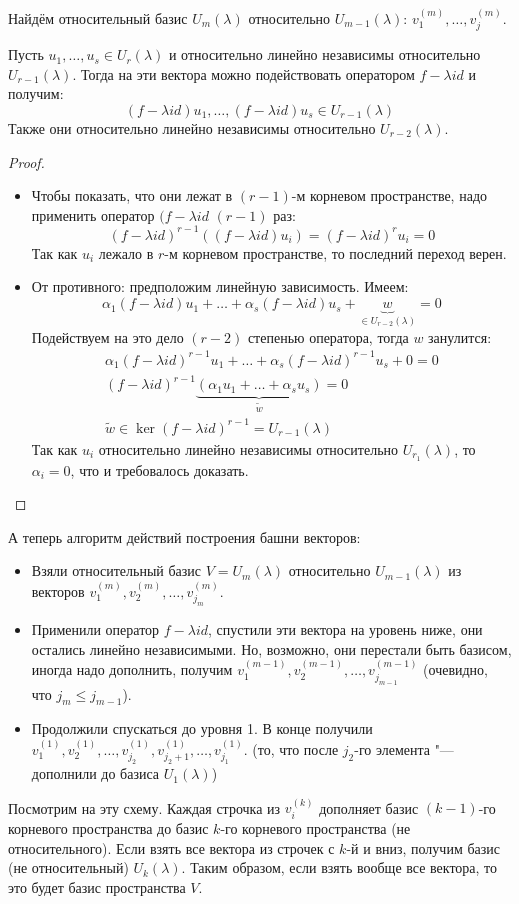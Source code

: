 Найдём относительный базис $U_m(\lambda)$ относительно $U_{m-1}(\lambda)$: $v_1^{(m)}, \dots, v_j^{(m)}$.
\begin{lemma}
	Пусть $u_1, \dots, u_s \in U_r(\lambda)$ и относительно линейно независимы относительно $U_{r-1}(\lambda)$.
	Тогда на эти вектора можно подействовать оператором $f-\lambda id$ и получим:
	\[ (f-\lambda id)u_1, \dots, (f-\lambda id)u_s \in U_{r-1}(\lambda)\]
	Также они относительно линейно независимы относительно $U_{r-2}(\lambda)$.
\end{lemma}
\begin{proof}
	\begin{itemize}
	\item
		Чтобы показать, что они лежат в $(r-1)$-м корневом пространстве, надо применить оператор $(f-\lambda id$ $(r-1)$ раз:
		\[ (f - \lambda id)^{r-1} ((f-\lambda id) u_i) = (f - \lambda id)^r u_i = 0 \]
		Так как $u_i$ лежало в $r$-м корневом пространстве, то последний переход верен.
	\item
		От противного: предположим линейную зависимость.
		Имеем:
		\[ \alpha_1(f-\lambda id) u_1 + \dots + \alpha_s (f-\lambda id) u_s + \underbrace{w}_{\in U_{r-2}(\lambda)} = 0\]
		Подействуем на это дело $(r-2)$ степенью оператора, тогда $w$ занулится:
		\begin{gather*}
			\alpha_1(f-\lambda id)^{r-1} u_1 + \dots + \alpha_s (f-\lambda id)^{r-1} u_s + 0 = 0 \\
			(f-\lambda id)^{r-1}\underbrace{(\alpha_1 u_1 + \dots + \alpha_s u_s )}_{\widetilde w} = 0 \\
			\widetilde w \in \ker (f - \lambda id)^{r-1} = U_{r-1}(\lambda)
		\end{gather*}
		Так как $u_i$ относительно линейно независимы относительно $U_{r_1}(\lambda)$, то $\alpha_i=0$,
		что и требовалось доказать.
	\end{itemize}
\end{proof}

А теперь алгоритм действий построения башни векторов:
\begin{itemize}
\item
	Взяли относительный базис $V=U_m(\lambda)$ относительно $U_{m-1}(\lambda)$ из векторов
	$v_1^{(m)}, v_2^{(m)}, \dots, v_{j_m}^{(m)}$.
\item
	Применили оператор $f - \lambda id$, спустили эти вектора на уровень ниже, они остались линейно независимыми.
	Но, возможно, они перестали быть базисом, иногда надо дополнить, получим
	$v_1^{(m-1)}, v_2^{(m-1)}, \dots, v_{j_{m-1}}^{(m-1)}$
	(очевидно, что $j_m \le j_{m-1}$).
\item
	Продолжили спускаться до уровня 1.
	В конце получили $v_1^{(1)}, v_2^{(1)}, \dots, v_{j_{2}}^{(1)}, v_{j_{2}+1}^{(1)}, \dots, v_{j_{1}}^{(1)}$.
	(то, что после $j_2$-го элемента "--- дополнили до базиса $U_1(\lambda)$)
\end{itemize}
Посмотрим на эту схему.
Каждая строчка из $v_i^{(k)}$ дополняет базис $(k-1)$-го корневого пространства до базис $k$-го
корневого пространства (не относительного).
Если взять все вектора из строчек с $k$-й и вниз, получим базис (не относительный) $U_k(\lambda)$.
Таким образом, если взять вообще все вектора, то это будет базис пространства $V$.

